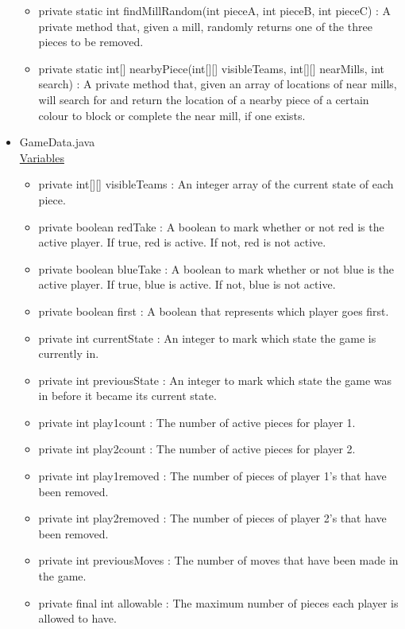 \documentclass[12pt]{article}
\begin{document}
\begin{itemize}
\begin{itemize}
		\item private static int findMillRandom(int pieceA, int pieceB, int pieceC) : A private method that, given a mill, randomly returns one of the three pieces to be removed.
		\item private static int[] nearbyPiece(int[][] visibleTeams, int[][] nearMills, int search) : A private method that, given an array of locations of near mills, will search for and return the location of a nearby piece of a certain colour to block or complete the near mill, if one exists.
	\end{itemize}
	\item GameData.java \\
	\underline{Variables}
	\begin{itemize}
		\item private int[][] visibleTeams : An integer array of the current state of each piece.
		\item private boolean redTake : A boolean to mark whether or not red is the active player. If true, red is active. If not, red is not active.
		\item private boolean blueTake : A boolean to mark whether or not blue is the active player. If true, blue is active. If not, blue is not active.
		\item private boolean first : A boolean that represents which player goes first.
		\item private int currentState : An integer to mark which state the game is currently in.
		\item private int previousState : An integer to mark which state the game was in before it became its current state.
		\item private int play1count : The number of active pieces for player 1.
		\item private int play2count : The number of active pieces for player 2.
		\item private int play1removed : The number of pieces of player 1’s that have been removed.
		\item private int play2removed : The number of pieces of player 2’s that have been removed.
		\item private int previousMoves : The number of moves that have been made in the game.
		\item private final int allowable : The maximum number of pieces each player is allowed to have.
		

\end{itemize}
\end{itemize}
\end{document}
